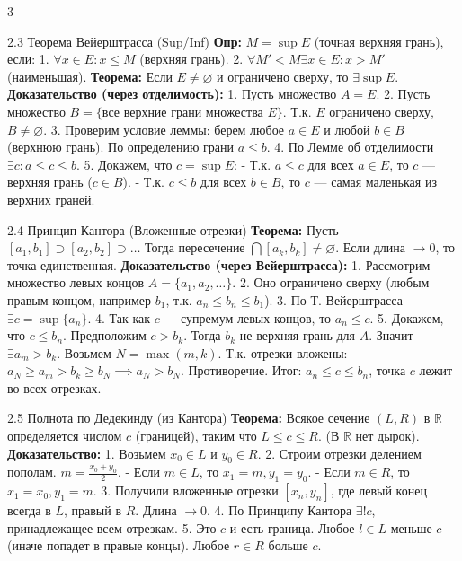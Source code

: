 \documentclass[8pt, a4paper, landscape]{extarticle}
\newcommand{\R}{\mathbb{R}}
\begin{document}
\begin{multicols*}{3}
\begin{ticket}{2.3 Теорема Вейерштрасса (Sup/Inf)}
\textbf{Опр:} $M = \sup E$ (точная верхняя грань), если:
1. $\forall x \in E: x \le M$ (верхняя грань).
2. $\forall M' < M \exists x \in E: x > M'$ (наименьшая).
\textbf{Теорема:} Если $E \ne \varnothing$ и ограничено сверху, то $\exists \sup E$.
\tcblower
\textbf{Доказательство (через отделимость):}
1. Пусть множество $A = E$.
2. Пусть множество $B = \{ \text{все верхние грани множества } E \}$.
Т.к. $E$ ограничено сверху, $B \ne \varnothing$.
3. Проверим условие леммы: берем любое $a \in E$ и любой $b \in B$ (верхнюю грань). По определению грани $a \le b$.
4. По Лемме об отделимости $\exists c: a \le c \le b$.
5. Докажем, что $c = \sup E$:
- Т.к. $a \le c$ для всех $a \in E$, то $c$ — верхняя грань ($c \in B$).
- Т.к. $c \le b$ для всех $b \in B$, то $c$ — самая маленькая из верхних граней.
\end{ticket}

\begin{ticket}{2.4 Принцип Кантора (Вложенные отрезки)}
\textbf{Теорема:} Пусть $[a_1, b_1] \supset [a_2, b_2] \supset \dots$
Тогда пересечение $\bigcap [a_k, b_k] \ne \varnothing$.
Если длина $\to 0$, то точка единственная.
\tcblower
\textbf{Доказательство (через Вейерштрасса):}
1. Рассмотрим множество левых концов $A = \{a_1, a_2, \dots\}$.
2. Оно ограничено сверху (любым правым концом, например $b_1$, т.к. $a_n \le b_n \le b_1$).
3. По Т. Вейерштрасса $\exists c = \sup \{a_n\}$.
4. Так как $c$ — супремум левых концов, то $a_n \le c$.
5. Докажем, что $c \le b_n$.
Предположим $c > b_k$. Тогда $b_k$ не верхняя грань для $A$.
Значит $\exists a_m > b_k$.
Возьмем $N = \max(m, k)$. Т.к. отрезки вложены:
$a_N \ge a_m > b_k \ge b_N \implies a_N > b_N$. Противоречие.
Итог: $a_n \le c \le b_n$, точка $c$ лежит во всех отрезках.
\end{ticket}

\begin{ticket}{2.5 Полнота по Дедекинду (из Кантора)}
\textbf{Теорема:} Всякое сечение $(L, R)$ в $\R$ определяется числом $c$ (границей), таким что $L \le c \le R$. (В $\R$ нет дырок).
\tcblower
\textbf{Доказательство:}
1. Возьмем $x_0 \in L$ и $y_0 \in R$.
2. Строим отрезки делением пополам. $m = \frac{x_0+y_0}{2}$.
- Если $m \in L$, то $x_1 = m, y_1 = y_0$.
- Если $m \in R$, то $x_1 = x_0, y_1 = m$.
3. Получили вложенные отрезки $[x_n, y_n]$, где левый конец всегда в $L$, правый в $R$. Длина $\to 0$.
4. По Принципу Кантора $\exists ! c$, принадлежащее всем отрезкам.
5. Это $c$ и есть граница.
Любое $l \in L$ меньше $c$ (иначе попадет в правые концы).
Любое $r \in R$ больше $c$.
\end{ticket}


\end{multicols*}
\end{document}

